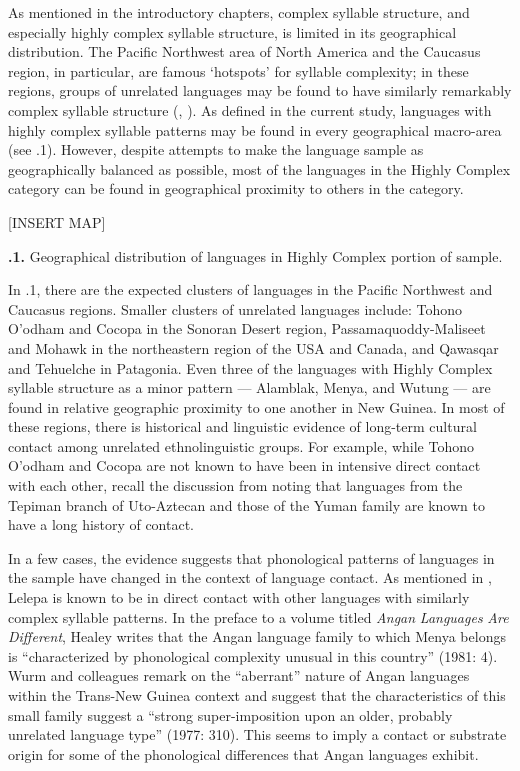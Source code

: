   As mentioned in the introductory chapters, complex syllable structure, and especially highly complex syllable structure, is limited in its geographical distribution. The Pacific Northwest area of North America and the Caucasus region, in particular, are famous ‘hotspots’ for syllable complexity; in these regions, groups of unrelated languages may be found to have similarly remarkably complex syllable structure (\citealt{Chirikba2008}, \citealt{ThompsonKinkade1990}). As defined in the current study, languages with highly complex syllable patterns may be found in every geographical macro-area (see .1). However, despite attempts to make the language sample as geographically balanced as possible, most of the languages in the Highly Complex category can be found in geographical proximity to others in the category.



[INSERT MAP]



\textbf{.1.} Geographical distribution of languages in Highly Complex portion of sample.



  In .1, there are the expected clusters of languages in the Pacific Northwest and Caucasus regions. Smaller clusters of unrelated languages include: Tohono O’odham and Cocopa in the Sonoran Desert region, Passamaquoddy-Maliseet and Mohawk in the northeastern region of the USA and Canada, and Qawasqar and Tehuelche in Patagonia. Even three of the languages with Highly Complex syllable structure as a minor pattern — Alamblak, Menya, and Wutung — are found in relative geographic proximity to one another in New Guinea. In most of these regions, there is historical and linguistic evidence of long-term cultural contact among unrelated ethnolinguistic groups. For example, while Tohono O’odham and Cocopa are not known to have been in intensive direct contact with each other, recall the discussion from  noting that languages from the Tepiman branch of Uto-Aztecan and those of the Yuman family are known to have a long history of contact. 



  In a few cases, the evidence suggests that phonological patterns of languages in the sample have changed in the context of language contact. As mentioned in , Lelepa is known to be in direct contact with other languages with similarly complex syllable patterns. In the preface to a volume titled \textit{Angan} \textit{Languages} \textit{Are} \textit{Different}, Healey writes that the Angan language family to which Menya belongs is “characterized by phonological complexity unusual in this country” (1981: 4). Wurm and colleagues remark on the “aberrant” nature of Angan languages within the Trans-New Guinea context and suggest that the characteristics of this small family suggest a “strong super-imposition upon an older, probably unrelated language type” (1977: 310). This seems to imply a contact or substrate origin for some of the phonological differences that Angan languages exhibit.



